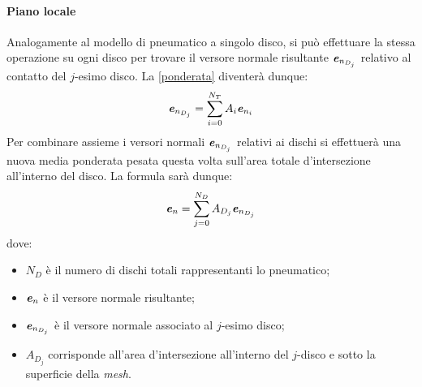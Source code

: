 \paragraph{Piano locale}
Analogamente al modello di pneumatico a singolo disco, si può effettuare la stessa operazione su ogni disco per trovare il versore normale risultante $\textbf{\textit{e}}_{n_{D_j}}$ relativo al contatto del $j$-esimo disco. La \eqref{ponderata} diventerà dunque:
%
\begin{equation}
\textbf{\textit{e}}_{n_{D_j}} = \sum_{i=0}^{N_T}A_i\textbf{\textit{e}}_{n_i}
\end{equation}
%
Per combinare assieme i versori normali $\textbf{\textit{e}}_{n_{D_j}}$ relativi ai dischi si effettuerà una nuova media ponderata pesata questa volta sull'area totale d'intersezione all'interno del disco. La formula sarà dunque:
%
\begin{equation}
\textbf{\textit{e}}_n = \sum_{j=0}^{N_D}A_{D_j}\textbf{\textit{e}}_{n_{D_j}}
\end{equation}
%
dove:
\begin{itemize}
	\item $N_D$ è il numero di dischi totali rappresentanti lo pneumatico;
	\item $\textbf{\textit{e}}_n$ è il versore normale risultante;
	\item $\textbf{\textit{e}}_{n_{D_j}}$ è il versore normale associato al $j$-esimo disco;
	\item $A_{D_j}$ corrisponde all'area d'intersezione all'interno del $j$-disco e sotto la superficie della \textit{mesh}.
\end{itemize}
